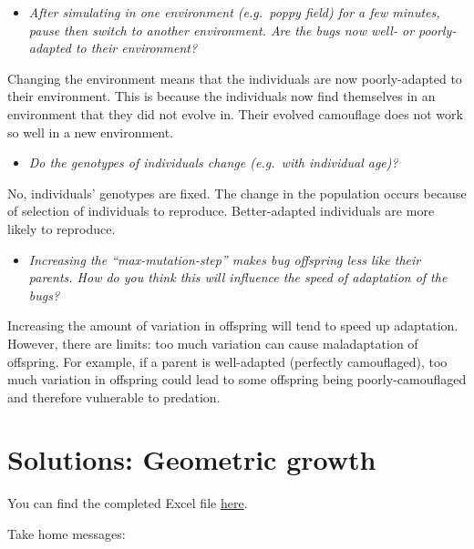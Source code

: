 \documentclass[
  a4paper]{book}
\providecommand{\tightlist}{%
  \setlength{\itemsep}{0pt}\setlength{\parskip}{0pt}}
\begin{document}
\begin{itemize}
\tightlist
\item
  \emph{After simulating in one environment (e.g.~poppy field) for a few minutes, pause then switch to another environment. Are the bugs now well- or poorly-adapted to their environment?}
\end{itemize}

Changing the environment means that the individuals are now poorly-adapted to their environment. This is because the individuals now find themselves in an environment that they did not evolve in. Their evolved camouflage does not work so well in a new environment.

\begin{itemize}
\tightlist
\item
  \emph{Do the genotypes of individuals change (e.g.~with individual age)?}
\end{itemize}

No, individuals' genotypes are fixed. The change in the population occurs because of selection of individuals to reproduce. Better-adapted individuals are more likely to reproduce.

\begin{itemize}
\tightlist
\item
  \emph{Increasing the ``max-mutation-step'' makes bug offspring less like their parents. How do you think this will influence the speed of adaptation of the bugs?}
\end{itemize}

Increasing the amount of variation in offspring will tend to speed up adaptation. However, there are limits: too much variation can cause maladaptation of offspring. For example, if a parent is well-adapted (perfectly camouflaged), too much variation in offspring could lead to some offspring being poorly-camouflaged and therefore vulnerable to predation.

\section{Solutions: Geometric growth}\label{solutions-geometric-growth}

You can find the completed Excel file \href{https://www.dropbox.com/s/sfxu1lbrxyqt462/GeometricGrowth\%20-\%20complete.xlsx?dl=1}{here}.

Take home messages:
\end{document}
